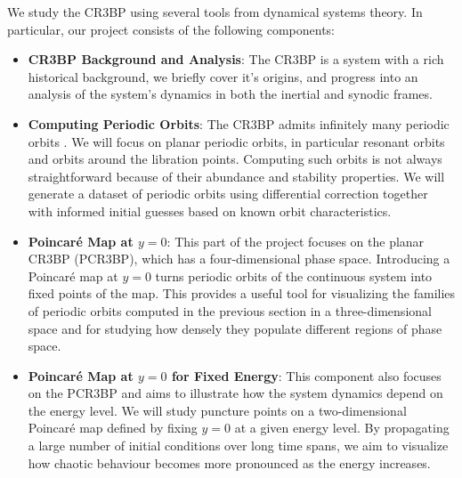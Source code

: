 We study the CR3BP using several tools from dynamical systems theory.
In particular, our project consists of the following components:
\begin{itemize}

    \item \textbf{CR3BP Background and Analysis}: The CR3BP is a system with a rich historical background, we briefly cover it's origins, and progress into an analysis of the system's dynamics in both the inertial and synodic frames.
    
    \item \textbf{Computing Periodic Orbits}: The CR3BP admits infinitely many periodic orbits \cite{Poincare_1893}. We will focus on planar periodic orbits, in particular resonant orbits and orbits around the libration points. Computing such orbits is not always straightforward because of their abundance and stability properties. We will generate a dataset of periodic orbits using differential correction together with informed initial guesses based on known orbit characteristics.
    
    \item \textbf{Poincaré Map at $y=0$}: This part of the project focuses on the planar CR3BP (PCR3BP), which has a four-dimensional phase space. Introducing a Poincaré map at $y=0$ turns periodic orbits of the continuous system into fixed points of the map. This provides a useful tool for visualizing the families of periodic orbits computed in the previous section in a three-dimensional space and for studying how densely they populate different regions of phase space.
    
    \item \textbf{Poincaré Map at $y=0$ for Fixed Energy}: This component also focuses on the PCR3BP and aims to illustrate how the system dynamics depend on the energy level. We will study puncture points on a two-dimensional Poincaré map defined by fixing $y=0$ at a given energy level. By propagating a large number of initial conditions over long time spans, we aim to visualize how chaotic behaviour becomes more pronounced as the energy increases.
    
    

\end{itemize}
